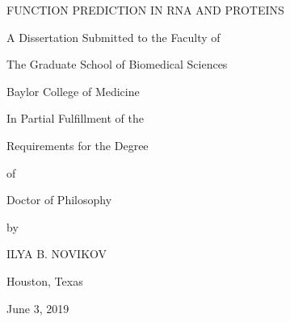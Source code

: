 \documentclass[12pt,a4paper]{report}
\begin{document}
\begin{titlepage}
\begin{spacing}{1}
	\centering
	\vspace*{0.8cm}
	\MakeUppercase{\fontsize{18}{22}\selectfont Function prediction in RNA and proteins} \par
	\vspace{1.3cm}
	A Dissertation Submitted to the Faculty of\par
	\vspace{0.6cm}
	The Graduate School of Biomedical Sciences\par
	Baylor College of Medicine\par
	\vspace{1.3cm}
	In Partial Fulfillment of the\par
	\vspace{0.6cm}
	Requirements for the Degree\par
	\vspace{0.6cm}
	of\par
	\vspace{0.6cm}
	Doctor of Philosophy\par
	\vspace{0.6cm}
	by\par
	\vspace{2cm}
	ILYA B. NOVIKOV\par
	\vspace{2.5cm}
	Houston, Texas\par
	\vspace{0.6cm}

	June 3, 2019

	\vfill

\end{spacing}
\end{titlepage}
\addtocounter{page}{1}
\end{document}
